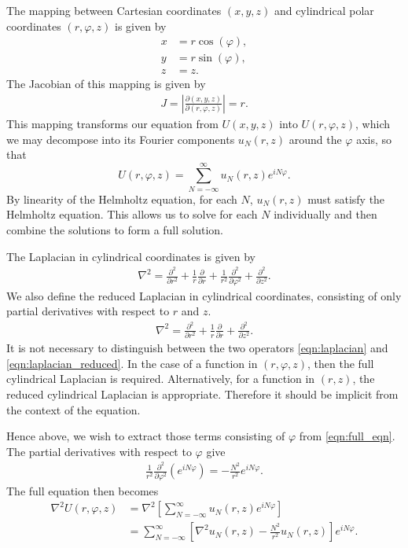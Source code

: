 The mapping between Cartesian coordinates $(x,y,z)$ and cylindrical polar coordinates $(r,\varphi,z)$ is given by
\begin{align}
	x &= r\cos(\varphi), \\
	y &= r\sin(\varphi), \\
	z &= z.
\end{align}
The Jacobian of this mapping is given by
\begin{align}
	J = \left\vert \frac{\partial(x,y,z)}{\partial(r,\varphi,z)} \right\vert = r. \label{eqn:cylindrical_mapping}
\end{align}
This mapping transforms our equation from $U(x,y,z)$ into $U(r,\varphi,z)$, 
which we may decompose into its Fourier components $u_N(r,z)$ around the $\varphi$ axis, so that
\begin{equation}
	U(r,\varphi,z) = \sum_{N=-\infty}^\infty u_N(r,z) e^{iN\varphi}. \label{eqn:full_eqn}
\end{equation}
By linearity of the Helmholtz equation, for each $N$, $u_N(r,z)$ must satisfy the Helmholtz equation.
This allows us to solve for each $N$ individually and then combine the solutions to form a full solution.

The Laplacian in cylindrical coordinates is given by
\begin{align}
	\nabla^2 = \frac{\partial^2 }{\partial r^2}
			 + \frac{1}{r} \frac{\partial }{\partial r}
			 + \frac{1}{r^2} \frac{\partial^2 }{\partial \varphi^2}
			 + \frac{\partial^2 }{\partial z^2}. \label{eqn:laplacian}
\end{align}
We also define the reduced Laplacian in cylindrical coordinates, consisting of only partial derivatives with respect to $r$ and $z$.
\begin{align}
	\nabla^2 = \frac{\partial^2 }{\partial r^2}
			 + \frac{1}{r} \frac{\partial }{\partial r}
			 + \frac{\partial^2 }{\partial z^2}. \label{eqn:laplacian_reduced}
\end{align}
It is not necessary to distinguish between the two operators \eqref{eqn:laplacian} and \eqref{eqn:laplacian_reduced}.
In the case of a function in $(r,\varphi,z)$, then the full cylindrical Laplacian is required.
Alternatively, for a function in $(r,z)$, the reduced cylindrical Laplacian is appropriate.
Therefore it should be implicit from the context of the equation.

Hence above, we wish to extract those terms consisting of $\varphi$ from \eqref{eqn:full_eqn}.
The partial derivatives with respect to $\varphi$ give
\begin{align}
	\frac{1}{r^2} \frac{\partial^2 }{\partial \varphi^2} \left( e^{i N \varphi}\right) = - \frac{N^2}{r^2} e^{i N \varphi}.
\end{align}
The full equation then becomes
\begin{align}
	\nabla^2 U(r,\varphi,z) 
		&= \nabla^2 \left[\sum_{N=-\infty}^\infty u_N(r,z) e^{i N \varphi}\right] \\
		&= \sum_{N=-\infty}^\infty \left[ 
										\nabla^2 u_N(r,z) - \frac{N^2}{r^2}u_N(r,z)
								   \right] e^{i N \varphi}.
\end{align}

